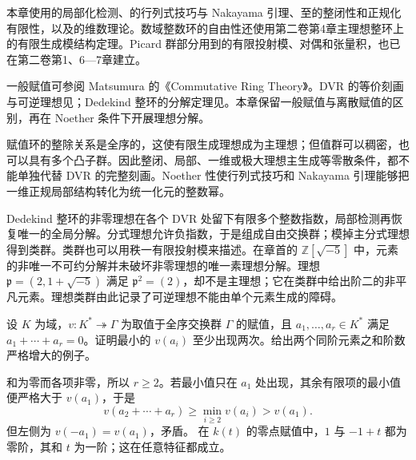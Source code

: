 \ProseParagraphBreak

本章使用的局部化检测、的行列式技巧与 Nakayama 引理、至的整闭性和正规化有限性，以及的维数理论。数域整数环的自由性还使用第二卷第4章主理想整环上的有限生成模结构定理。Picard 群部分用到的有限投射模、对偶和张量积，也已在第二卷第1、6—7章建立。

\ProseParagraphBreak
一般赋值可参阅 Matsumura 的《Commutative Ring Theory》\cite[\S10, General valuations, pp. 71--77]{Matsumura1989CommutativeRingTheory}。DVR 的等价刻画与可逆理想见\cite[Theorems 11.1--11.3, pp. 78--81]{Matsumura1989CommutativeRingTheory}；Dedekind 整环的分解定理见\cite[Theorem 11.6, pp. 82--84]{Matsumura1989CommutativeRingTheory}。本章保留一般赋值与离散赋值的区别，再在 Noether 条件下开展理想分解。






\begin{chaptersummary}
	赋值环的整除关系是全序的，这使有限生成理想成为主理想；但值群可以稠密，也可以具有多个凸子群。因此整闭、局部、一维或极大理想主生成等零散条件，都不能单独代替 DVR 的完整刻画。Noether 性使行列式技巧和 Nakayama 引理能够把一维正规局部结构转化为统一化元的整数幂。

	\ProseParagraphBreak
	Dedekind 整环的非零理想在各个 DVR 处留下有限多个整数指数，局部检测再恢复唯一的全局分解。分式理想允许负指数，于是组成自由交换群；模掉主分式理想得到类群。类群也可以用秩一有限投射模来描述。在章首的 \(\mathbb Z[\sqrt{-5}]\) 中，元素的非唯一不可约分解并未破坏非零理想的唯一素理想分解。理想 \(\mathfrak p=(2,1+\sqrt{-5})\) 满足 \(\mathfrak p^2=(2)\)，却不是主理想；它在类群中给出阶二的非平凡元素。理想类群由此记录了可逆理想不能由单个元素生成的障碍。
\end{chaptersummary}

\BookExercises

\begin{exercise}\label{b3:ex:10-lowest-valuation}
	设 \(K\) 为域，\(v:K^*\twoheadrightarrow\Gamma\) 为取值于全序交换群 \(\Gamma\) 的赋值，且 \(a_1,\ldots,a_r\in K^*\) 满足 \(a_1+\cdots+a_r=0\)。证明最小的 \(v(a_i)\) 至少出现两次。给出两个同阶元素之和阶数严格增大的例子。
\end{exercise}
\begin{solution}
	和为零而各项非零，所以 \(r\ge2\)。若最小值只在 \(a_1\) 处出现，其余有限项的最小值便严格大于 \(v(a_1)\)，于是
	\[
		v(a_2+\cdots+a_r)\ge\min_{i\ge2}v(a_i)>v(a_1).
	\]
	但左侧为 \(v(-a_1)=v(a_1)\)，矛盾。 在 \(k(t)\) 的零点赋值中，\(1\) 与 \(-1+t\) 都为零阶，其和 \(t\) 为一阶；这在任意特征都成立。
\end{solution}

